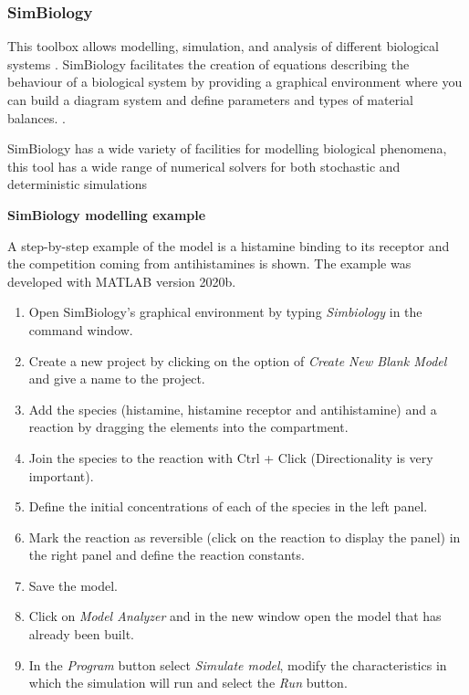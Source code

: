 \documentclass[11pt, letterpaper, english]{article}
\begin{document}
        \subsubsection{SimBiology}
        \par{This toolbox allows modelling, simulation, and analysis of different biological systems \cite{Kirouac2019}. SimBiology facilitates the creation of equations describing the behaviour of a biological system by providing a graphical environment where you can build a diagram system and define parameters and types of material balances. \cite{Feigelman2016}.}
        \par{SimBiology has a wide variety of facilities for modelling biological phenomena, this tool has a wide range of numerical solvers for both stochastic and deterministic simulations \cite{Ullah2006}}\\
        \par{\textbf{SimBiology modelling example}}
        \par{A step-by-step example of the model is a histamine binding to its receptor and the competition coming from antihistamines is shown. The example was developed with MATLAB version 2020b.}
            \begin{enumerate}[1.]
                \item Open SimBiology's graphical environment by typing \textit{Simbiology} in the command window.
                \item Create a new project by clicking on the option of \textit{Create New Blank Model} and give a name to the project.
                \item Add the species (histamine, histamine receptor and antihistamine) and a reaction by dragging the elements into the compartment.
                \item Join the species to the reaction with Ctrl + Click (Directionality is very important).
                \item Define the initial concentrations of each of the species in the left panel.
                \item Mark the reaction as reversible (click on the reaction to display the panel) in the right panel and define the reaction constants. 
                \item Save the model.
                \item Click on  \textit{Model Analyzer} and in the new window open the model that has already been built.
                \item In the  \textit{Program} button select \textit{Simulate model}, modify the characteristics in which the simulation will run and select the \textit{Run} button.
            \end{enumerate}
            
\end{document}
